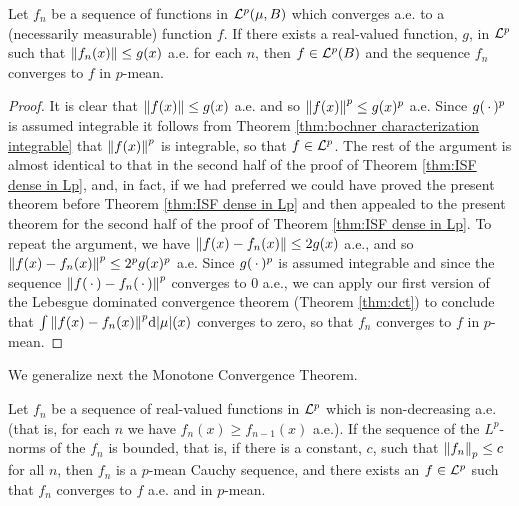 \begin{theorem}
Let $f_n$ be a sequence of functions in ${\cal L}^p(\mu,B)$ which converges a.e. to a (necessarily measurable) function $f$. If there exists a real-valued function, $g$, in ${\cal L}^p$ such that $\norm{f_n(x)}\leq g(x)$ a.e. for each $n$, then $f\in{\cal L}^p(B)$ and the sequence $f_n$ converges to $f$ in $p$-mean.
\end{theorem}

\begin{proof}
It is clear that $\norm{f(x)}\leq g(x)$ a.e. and so $\norm{f(x)}^p \leq g(x)^p$ a.e. Since $g(\,\cdot\,)^p$ is assumed integrable it follows from Theorem \ref{thm:bochner characterization integrable} that $\norm{f(x)}^p$ is integrable, so that $f\in{\cal L}^p$. The rest of the argument is almost identical to that in the second half of the proof of Theorem \ref{thm:ISF dense in Lp}, and, in fact, if we had preferred we could have proved the present theorem before Theorem \ref{thm:ISF dense in Lp} and then appealed to the present theorem for the second half of the proof of Theorem \ref{thm:ISF dense in Lp}. To repeat the argument, we have $\norm{f(x)-f_n(x)}\leq2g(x)$ a.e., and so $\norm{f(x)-f_n(x)}^p\leq2^pg(x)^p$ a.e. Since $g(\,\cdot\,)^p$ is assumed integrable and since the sequence $\norm{f(\,\cdot\,)-f_n(\,\cdot\,)}^p$ converges to 0 a.e., we can apply our first version of the Lebesgue dominated convergence theorem (Theorem \ref{thm:dct}) to conclude that $\int\norm{f(x)-f_n(x)}^p\dd|\mu|(x)$ converges to zero, so that $f_n$ converges to $f$ in $p$-mean.
\end{proof}

We generalize next the Monotone Convergence Theorem.

\begin{theorem}
\label{thm:mct for Lp}
Let $f_n$ be a sequence of real-valued functions in ${\cal L}^p$ which is non-decreasing a.e. (that is, for each $n$ we have $f_n(x)\geq f_{n-1}(x)$ a.e.). If the sequence of the $L^p$-norms of the $f_n$ is bounded, that is, if there is a constant, $c$, such that $\norm{f_n}_p\leq c$ for all $n$, then $f_n$ is a $p$-mean Cauchy sequence, and there exists an $f\in{\cal L}^p$ such that $f_n$ converges to $f$ a.e. and in $p$-mean.
\end{theorem}

